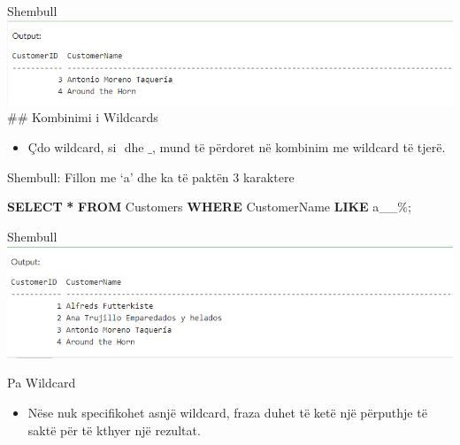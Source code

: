 \documentclass[
  ignorenonframetext,
]{beamer}
\newenvironment{Shaded}{\begin{snugshade}}{\end{snugshade}}
\newcommand{\KeywordTok}[1]{\textcolor[rgb]{0.13,0.29,0.53}{\textbf{#1}}}
\newcommand{\NormalTok}[1]{#1}
\newcommand{\OperatorTok}[1]{\textcolor[rgb]{0.81,0.36,0.00}{\textbf{#1}}}
\newcommand{\StringTok}[1]{\textcolor[rgb]{0.31,0.60,0.02}{#1}}
\providecommand{\tightlist}{%
  \setlength{\itemsep}{0pt}\setlength{\parskip}{0pt}}
\begin{document}
\begin{frame}{Shembull}
\label{shembull-9}
\includegraphics{./Figs/query65.png} \#\# Kombinimi i Wildcards

\begin{itemize}
\tightlist
\item
  Çdo wildcard, si \(%
  \) dhe \(\_\), mund të përdoret në kombinim me wildcard të tjerë.
\end{itemize}
\end{frame}

\begin{frame}[fragile]{Shembull: Fillon me `a' dhe ka të paktën 3
karaktere}
\label{shembull-fillon-me-a-dhe-ka-tuxeb-paktuxebn-3-karaktere}
\begin{Shaded}
\begin{Highlighting}[]
\KeywordTok{SELECT} \OperatorTok{*}
\KeywordTok{FROM}\NormalTok{ Customers}
\KeywordTok{WHERE}\NormalTok{ CustomerName }\KeywordTok{LIKE} \StringTok{\textquotesingle{}a\_\_\%\textquotesingle{}}\NormalTok{;}
\end{Highlighting}
\end{Shaded}
\end{frame}

\begin{frame}{Shembull}
\label{shembull-10}
\includegraphics{./Figs/query66.png}
\end{frame}

\begin{frame}{Pa Wildcard}
\label{pa-wildcard}
\begin{itemize}
\tightlist
\item
  Nëse nuk specifikohet asnjë wildcard, fraza duhet të ketë një
  përputhje të saktë për të kthyer një rezultat.
\end{itemize}
\end{frame}
\end{document}
